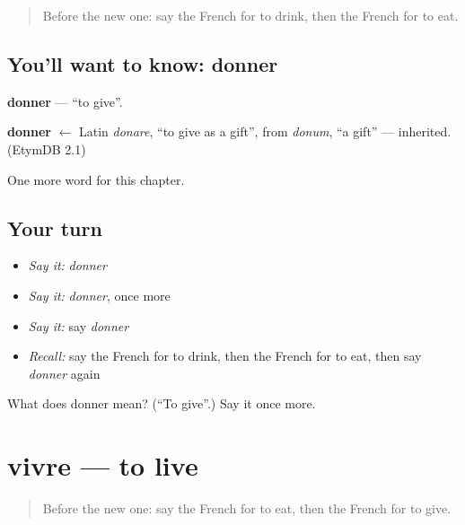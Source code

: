 \label{lesson:FR-C61-donner}



\begin{quote}
Before the new one: say the French for to drink, then the French for to eat.
\end{quote}

\subsection*{You'll want to know: donner}
\textbf{donner} — \textquotedblleft{}to give\textquotedblright{}.

\begin{cousinweb}
\textbf{donner} $\leftarrow$ Latin \emph{donare}, \textquotedblleft{}to give as a gift\textquotedblright{}, from \emph{donum}, \textquotedblleft{}a gift\textquotedblright{} — inherited. (EtymDB 2.1)
\end{cousinweb}

\begin{grammarlens}[title={What you've built}]
One more word for this chapter.
\end{grammarlens}

\subsection*{Your turn}
\begin{itemize}
\raggedright
  \item \emph{Say it:} \emph{donner}
  \item \emph{Say it:} \emph{donner}, once more
  \item \emph{Say it:} say \emph{donner}
  \item \emph{Recall:} say the French for to drink, then the French for to eat, then say \emph{donner} again
\end{itemize}

\begin{tcolorbox}[breakable,colback=teal!4,colframe=teal!35!black,title={Before you move on}]
What does donner mean? (\textquotedblleft{}To give\textquotedblright{}.) Say it once more.
\end{tcolorbox}
\section[vivre]{vivre — to live}

\label{lesson:FR-C61-vivre}



\begin{quote}
Before the new one: say the French for to eat, then the French for to give.
\end{quote}


